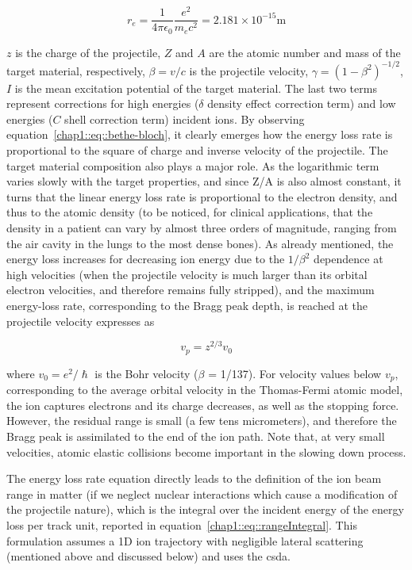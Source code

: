 \begin{equation}
r_{e} = \frac{1}{4\pi\epsilon_{0}}\frac{e^2}{m_{e}c^{2}} = \mathrm{2.181\times10^{-15} m}
\label{chap1::eq::electronRad}
\end{equation}

$z$ is the charge of the projectile, $Z$ and $A$ are the atomic number and mass of the target material, respectively, $\beta = v/c$ is the projectile velocity, $\gamma = (1-\beta^{2})^{-1/2}$, $I$ is the mean excitation potential of the target material. The last two terms represent corrections for high energies ($\delta$ density effect correction term) and low energies ($C$ shell correction term) incident ions. By observing equation~\ref{chap1::eq::bethe-bloch}, it clearly emerges how the energy loss rate is proportional to the square of charge and inverse velocity of the projectile. The target material composition also plays a major role. As the logarithmic term varies slowly with the target properties, and since Z/A is also almost constant, it turns that the linear energy loss rate is proportional to the electron density, and thus to the atomic density (to be noticed, for clinical applications, that the density in a patient can vary by almost three orders of magnitude, ranging from the air cavity in the lungs to the most dense bones). 
As already mentioned, the energy loss increases for decreasing ion energy due to the $1/\beta^{2}$ dependence at high velocities (when the projectile velocity is much larger than its orbital electron velocities, and therefore remains fully stripped), and the maximum energy-loss rate, corresponding to the Bragg peak depth, is reached at the projectile velocity expresses as

\begin{equation}
v_p = z^{2/3}v_{0}
\label{chap1::eq::maxEloss}
\end{equation}

where $v_{0} = e^2/\hslash$ is the Bohr velocity ($\beta$ = 1/137). For velocity values below $v_p$, corresponding to the average orbital velocity in the Thomas-Fermi atomic model, the ion captures electrons and its charge decreases, as well as the stopping force. However, the residual range is small (a few tens micrometers), and therefore the Bragg peak is assimilated to the end of the ion path. Note that, at very small velocities, atomic elastic collisions become important in the slowing down process. 

The energy loss rate equation directly leads  to the definition of the ion beam range in matter (if we neglect nuclear interactions which cause a modification of the projectile nature), which is the integral over the incident energy of the energy loss per track unit, reported in equation~\ref{chap1::eq::rangeIntegral}. This formulation assumes a 1D ion trajectory with negligible lateral scattering (mentioned above and discussed below) and uses the \gls{csda}. 


